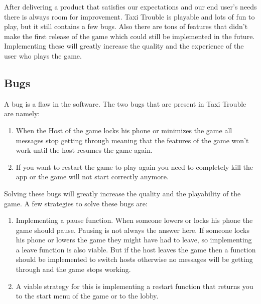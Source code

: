After delivering a product that satisfies our expectations and our end user's needs there is always room for improvement. Taxi Trouble is playable and lots of fun to play, but it still contains a few bugs. Also there are tons of features that didn't make the first release of the game which could still be implemented in the future. Implementing these will greatly increase the quality and the experience of the user who plays the game.\\

\subsection*{Bugs}
A bug is a flaw in the software. The two bugs that are present in Taxi Trouble are namely:
\begin{enumerate}
\item When the Host of the game locks his phone or minimizes the game all messages stop getting through meaning that the features of the game won't work until the host resumes the game again.
\item If you want to restart the game to play again you need to completely kill the app or the game will not start correctly anymore.
\end{enumerate} 
Solving these bugs will greatly increase the quality and the playability of the game. A few strategies to solve these bugs are: 
\begin{enumerate}
\item Implementing a pause function. When someone lowers or locks his phone the game should pause. Pausing is not always the answer here. If someone locks his phone or lowers the game they might have had to leave, so implementing a leave function is also viable. But if the host leaves the game then a function should be implemented to switch hosts otherwise no messages will be getting through and the game stops working.
\item A viable strategy for this is implementing a restart function that returns you to the start menu of the game or to the lobby. 
\end{enumerate}

